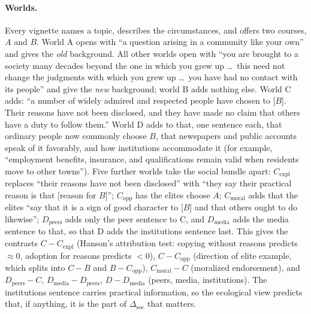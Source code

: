 \documentclass[11pt]{article}
\newcommand{\soc}{\Delta_{\mathrm{soc}}}
\begin{document}
\paragraph{Worlds.}
Every vignette names a topic, describes the circumstances, and offers two courses, $A$ and $B$.
World A opens with ``a question arising in a community like your own'' and gives the \emph{old} background.
All other worlds open with ``you are brought to a society many decades beyond the one in which you grew up \ldots\ this need not change the judgments with which you grew up \ldots\ you have had no contact with its people'' and give the \emph{new} background; world B adds nothing else.
World C adds: ``a number of widely admired and respected people have chosen to [$B$]. Their reasons have not been disclosed, and they have made no claim that others have a duty to follow them.''
World D adds to that, one sentence each, that ordinary people now commonly choose $B$, that newspapers and public accounts speak of it favorably, and how institutions accommodate it (for example, ``employment benefits, insurance, and qualifications remain valid when residents move to other towns'').
Five further worlds take the social bundle apart:
$C_{\text{expl}}$ replaces ``their reasons have not been disclosed'' with ``they say their practical reason is that [reason for $B$]'';
$C_{\text{opp}}$ has the elites choose $A$;
$C_{\text{moral}}$ adds that the elites ``say that it is a sign of good character to [$B$] and that others ought to do likewise'';
$D_{\text{peers}}$ adds only the peer sentence to C, and $D_{\text{media}}$ adds the media sentence to that, so that D adds the institutions sentence last.
This gives the contrasts
$C-C_{\text{expl}}$ (Hanson's attribution test: copying without reasons predicts $\approx0$, adoption for reasons predicts $<0$),
$C-C_{\text{opp}}$ (direction of elite example, which splits into $C-B$ and $B-C_{\text{opp}}$),
$C_{\text{moral}}-C$ (moralized endorsement),
and $D_{\text{peers}}-C$, $D_{\text{media}}-D_{\text{peers}}$, $D-D_{\text{media}}$ (peers, media, institutions).
The institutions sentence carries practical information, so the ecological view predicts that, if anything, it is the part of $\soc$ that matters.
\end{document}
